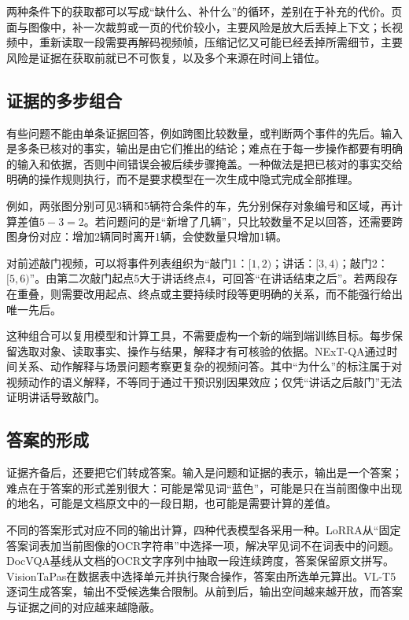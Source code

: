 两种条件下的获取都可以写成“缺什么、补什么”的循环，差别在于补充的代价。页面与图像中，补一次裁剪或一页的代价较小，主要风险是放大后丢掉上下文；长视频中，重新读取一段需要再解码视频帧，压缩记忆又可能已经丢掉所需细节，主要风险是证据在获取前就已不可恢复，以及多个来源在时间上错位。

\subsection{证据的多步组合}
\label{sec:vision-understanding-evidence-operations}

有些问题不能由单条证据回答，例如跨图比较数量，或判断两个事件的先后。输入是多条已核对的事实，输出是由它们推出的结论；难点在于每一步操作都要有明确的输入和依据，否则中间错误会被后续步骤掩盖。一种做法是把已核对的事实交给明确的操作规则执行，而不是要求模型在一次生成中隐式完成全部推理。

例如，两张图分别可见3辆和5辆符合条件的车，先分别保存对象编号和区域，再计算差值$5-3=2$。若问题问的是“新增了几辆”，只比较数量不足以回答，还需要跨图身份对应：增加2辆同时离开1辆，会使数量只增加1辆。

对前述敲门视频，可以将事件列表组织为“敲门1：$[1,2)$；讲话：$[3,4)$；敲门2：$[5,6)$”。由第二次敲门起点5大于讲话终点4，可回答“在讲话结束之后”。若两段存在重叠，则需要改用起点、终点或主要持续时段等更明确的关系，而不能强行给出唯一先后。

这种组合可以复用模型和计算工具，不需要虚构一个新的端到端训练目标。每步保留选取对象、读取事实、操作与结果，解释才有可核验的依据。NExT-QA通过时间关系、动作解释与场景问题考察更复杂的视频问答。其中“为什么”的标注属于对视频动作的语义解释，不等同于通过干预识别因果效应；仅凭“讲话之后敲门”无法证明讲话导致敲门。

\subsection{答案的形成}
\label{sec:vision-understanding-answering}

证据齐备后，还要把它们转成答案。输入是问题和证据的表示，输出是一个答案；难点在于答案的形式差别很大：可能是常见词“蓝色”，可能是只在当前图像中出现的地名，可能是文档原文中的一段日期，也可能是需要计算的差值。

不同的答案形式对应不同的输出计算，四种代表模型各采用一种。LoRRA从“固定答案词表加当前图像的OCR字符串”中选择一项，解决罕见词不在词表中的问题。DocVQA基线从文档的OCR文字序列中抽取一段连续跨度，答案保留原文拼写。VisionTaPas在数据表中选择单元并执行聚合操作，答案由所选单元算出。VL-T5逐词生成答案，输出不受候选集合限制。从前到后，输出空间越来越开放，而答案与证据之间的对应越来越隐蔽。

